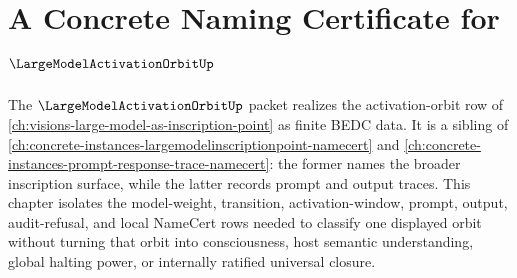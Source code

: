\chapter{A Concrete Naming Certificate for $\LargeModelActivationOrbitUp$}
\label{ch:concrete-instances-largemodelactivationorbit-namecert}

The $\LargeModelActivationOrbitUp$ packet realizes the activation-orbit row of \autoref{ch:visions-large-model-as-inscription-point} as finite BEDC data. It is a sibling of \autoref{ch:concrete-instances-largemodelinscriptionpoint-namecert} and \autoref{ch:concrete-instances-prompt-response-trace-namecert}: the former names the broader inscription surface, while the latter records prompt and output traces. This chapter isolates the model-weight, transition, activation-window, prompt, output, audit-refusal, and local NameCert rows needed to classify one displayed orbit without turning that orbit into consciousness, host semantic understanding, global halting power, or internally ratified universal closure.

